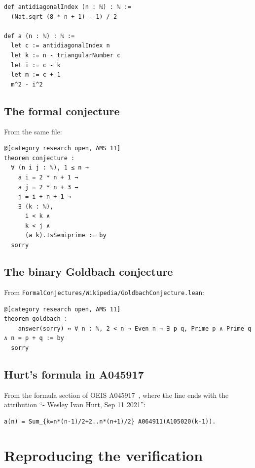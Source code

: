 \documentclass[11pt,a4paper]{article}
\theoremstyle{plain}
\theoremstyle{remark}
\begin{document}
{\begin{lstlisting}
def antidiagonalIndex (n : ℕ) : ℕ :=
  (Nat.sqrt (8 * n + 1) - 1) / 2

def a (n : ℕ) : ℕ :=
  let c := antidiagonalIndex n
  let k := n - triangularNumber c
  let i := c - k
  let m := c + 1
  m^2 - i^2
\end{lstlisting}

\subsection{The formal conjecture}\label{app:conj}

From the same file:
\begin{lstlisting}
@[category research open, AMS 11]
theorem conjecture :
  ∀ (n i j : ℕ), 1 ≤ n →
    a i = 2 * n + 1 →
    a j = 2 * n + 3 →
    j = i + n + 1 →
    ∃ (k : ℕ),
      i < k ∧
      k < j ∧
      (a k).IsSemiprime := by
  sorry
\end{lstlisting}

\subsection{The binary Goldbach conjecture}\label{app:goldbach}

From \nolinkurl{FormalConjectures/Wikipedia/GoldbachConjecture.lean}:
\begin{lstlisting}[basicstyle=\ttfamily\footnotesize]
@[category research open, AMS 11]
theorem goldbach :
    answer(sorry) ↔ ∀ n : ℕ, 2 < n → Even n → ∃ p q, Prime p ∧ Prime q ∧ n = p + q := by
  sorry
\end{lstlisting}

\subsection{Hurt's formula in A045917}\label{app:hurt}

From the formula section of OEIS A045917~\cite{oeis-a045917}, where the line ends with
the attribution ``- Wesley Ivan Hurt, Sep 11 2021'':
\begin{lstlisting}
a(n) = Sum_{k=n*(n-1)/2+2..n*(n+1)/2} A064911(A105020(k-1)).
\end{lstlisting}

\section{Reproducing the verification}\label{app:repro}

}
\end{document}
